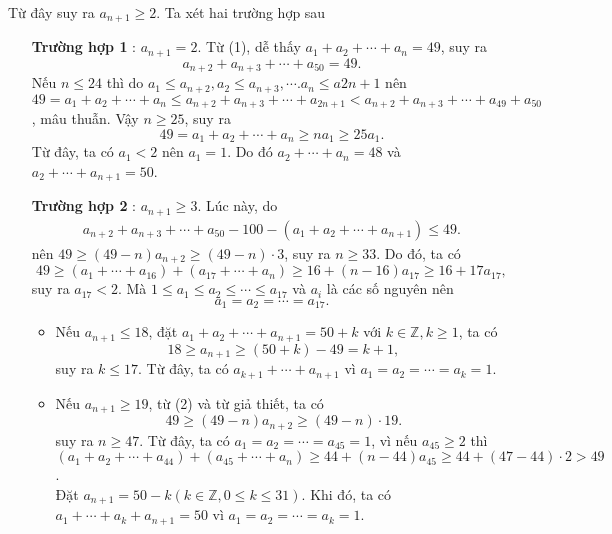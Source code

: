 \begin{ex}
{\begin{enumerate}
		Từ đây suy ra $a_{n+1}\geq 2$. Ta xét hai trường hợp sau\\
		\begin{enumerate}
			\item[\textbf{Trường hợp 1}]: $a_{n+1}=2$. Từ (1), dễ thấy $a_1+a_2+\cdots+a_n=49$, suy ra
			$$a_{n+2}+a_{n+3}+\cdots+a_{50}=49.$$
			Nếu $n\leq 24$ thì do $a_1\leq a_{n+2},a_2\leq a_{n+3},\cdots.a_n\leq a{2n+1}$ nên\\ $49=a_1+a_2+\cdots +a_n\leq a_{n+2}+a_{n+3}+\cdots+a_{2n+1}< a_{n+2}+a_{n+3}+\cdots+a_{49}+a_{50}$, mâu thuẫn. Vậy $n\geq 25$, suy ra
			$$49=a_1+a_2+\cdots+a_n\geq na_1\geq 25a_1.$$
			Từ đây, ta có $a_1<2$ nên $a_1=1$. Do đó $a_2+\cdots+a_n=48$ và $a_2+\cdots+a_{n+1}=50$. 
			\item[\textbf{Trường hợp 2}]: $a_{n+1}\geq 3$. Lúc này, do
			\begin{align*}
		a_{n+2}+a_{n+3}+\cdots+a_{50}-100-(a_1+a_2+\cdots+a_{n+1})\leq 49.\tag{2}
						\end{align*}
			nên $49\geq (49-n)a_{n+2}\geq (49-n)\cdot 3$, suy ra $n\geq 33$. Do đó, ta có
			$$49\geq (a_1+\cdots+a_{16})+(a_{17}+\cdots+a_n)\geq 16+(n-16)a_{17}\geq 16+17a_{17},$$
				suy ra $a_{17}<2$. Mà $1\leq a_1\leq a_2\leq\cdots\leq a_{17}$ và $a_i$ là các số nguyên nên
				$$a_1=a_2=\cdots=a_{17}.$$
				\begin{itemize}
					\item Nếu $a_{n+1}\leq 18$, đặt $a_1+a_2+\cdots+a_{n+1}=50+k$ với $k\in\mathbb{Z},k\geq 1$, ta có
					$$18\geq a_{n+1}\geq (50+k)-49=k+1,$$
					suy ra $k\leq 17$. Từ đây, ta có $a_{k+1}+\cdots+a_{n+1}$ vì $a_1=a_2=\cdots=a_k=1$.
					\item Nếu $a_{n+1}\geq 19$, từ (2) và từ giả thiết, ta có
					$$49\geq (49-n)a_{n+2}\geq (49-n)\cdot 19.$$
					suy ra $n\geq 47$. Từ đây, ta có $a_1=a_2=\cdots=a_{45}=1$, vì nếu $a_{45}\geq 2$ thì $(a_1+a_2+\cdots+a_{44})+(a_{45}+\cdots+a_n)\geq 44+(n-44)a_{45}\geq 44+(47-44)\cdot2>49$.\\
					Đặt $a_{n+1}=50-k(k\in\mathbb{Z},0\leq k\leq 31)$. Khi đó, ta có $a_1+\cdots+a_k+a_{n+1}=50$ vì $a_1=a_2=\cdots=a_k=1$.
				\end{itemize}
		\end{enumerate}
	\end{enumerate}
	}
\end{ex}
